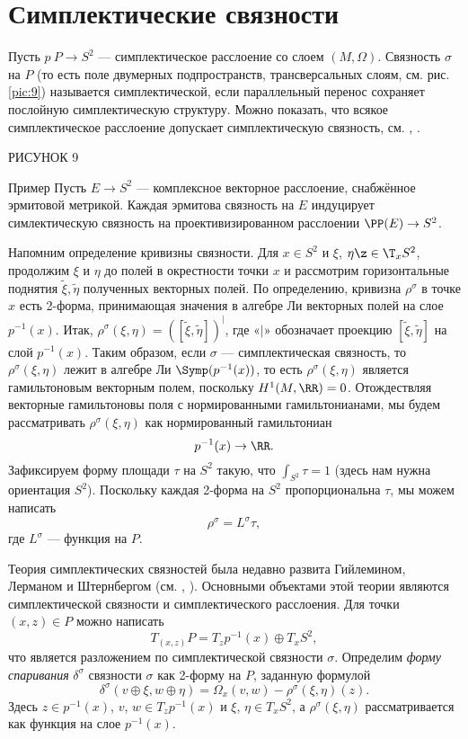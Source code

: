 \section{Симплектические связности}

Пусть $p\: P\to S^2$ --- симплектическое расслоение со слоем $(M,\Omega)$.
Связность $\sigma$ на $P$ (то есть поле двумерных подпространств, трансверсальных слоям, см. рис. \ref{pic:9}) называется симплектической, если параллельный перенос сохраняет послойную симплектическую структуру.
Можно показать, что всякое симплектическое расслоение допускает симплектическую связность, см. \cite{GLS}, \cite{MS}.

РИСУНОК 9 

\begin{thm*}{Пример}
Пусть $E \to S^2$ --- комплексное векторное расслоение, снабжённое эрмитовой метрикой.
Каждая эрмитова связность на $E$ индуцирует симлектическую связность на проективизированном расслоении $\PP(E) \to S^2$.
\end{thm*}

Напомним определение кривизны связности.
Для $x \in S^2$ и $\xi$, $\eta \z\in \T_x S^2$, продолжим $\xi$ и $\eta$ до полей в окрестности точки $x$ и рассмотрим горизонтальные поднятия $\tilde\xi, \tilde\eta$ полученных векторных полей.
По определению, кривизна $\rho^\sigma$ в точке $x$ есть 2-форма, принимающая значения в алгебре Ли векторных полей на слое $p^{-1} (x)$.
Итак, $\rho^\sigma (\xi, \eta) = ([\tilde\xi, \tilde\eta])^\vert$, где «$\vert$» обозначает проекцию $[\tilde\xi, \tilde\eta]$ на слой $p^{-1} (x)$.
Таким образом, если $\sigma$ --- симплектическая связность, то $\rho^\sigma (\xi, \eta)$ лежит в алгебре Ли $\Symp(p^{-1} (x))$, то есть $\rho^\sigma (\xi, \eta)$ является гамильтоновым векторным полем, поскольку $H^1 (M, \RR) = 0$.
Отождествляя векторные гамильтоновы поля с нормированными гамильтонианами, мы будем рассматривать $\rho^\sigma (\xi, \eta)$ как нормированный гамильтониан
\[p^{-1} (x) \to \RR.\]
Зафиксируем форму площади $\tau$ на $S^2$ такую, что $\int_{S^2} \tau = 1$ (здесь нам нужна ориентация $S^2$).
Поскольку каждая 2-форма на $S^2$ пропорциональна $\tau$, мы можем написать 
\[\rho^\sigma = L^\sigma \tau,\]
где $L^\sigma$ --- функция на $P$.

Теория симплектических связностей была недавно развита Гийлемином, Лерманом и Штернбергом (см. \cite{GLS}, \cite{MS}).
Основными объектами этой теории являются  симплектической связности и  симплектического расслоения.
Для точки $(x, z) \in P$ можно написать 
\[T_{(x,z)} P = T_z p^{-1} (x) \oplus T_x S^2,\]
что является разложением по симплектической связности $\sigma$.
Определим \emph{форму спаривания} $\delta^\sigma$ связности $\sigma$ как 2-форму на $P$, заданную формулой 
\[\delta^\sigma (v \oplus \xi, w \oplus \eta) = \Omega_x (v, w) - \rho^\sigma (\xi, \eta)(z).\]
Здесь $z \in p^{-1} (x)$, $v$, $w \in T_z p^{-1} (x)$ и $\xi$, $\eta \in T_x S^2$, а $\rho^\sigma (\xi, \eta)$ рассматривается как функция на слое $p^{-1} (x)$.

